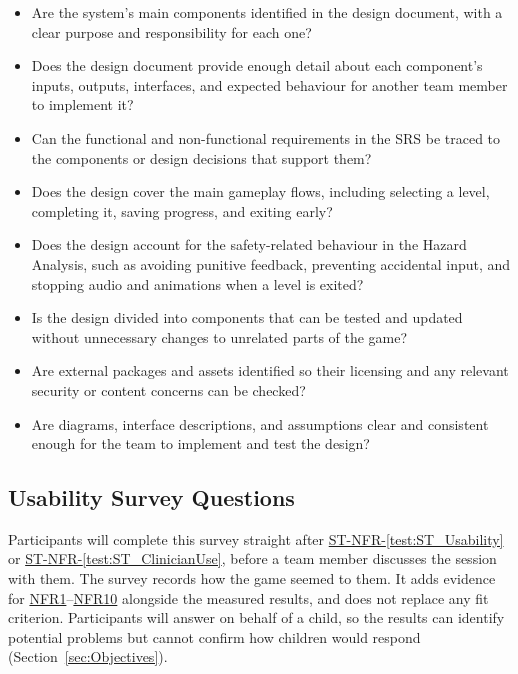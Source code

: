 \documentclass[10pt,titlepage]{article}
\newcommand{\testref}[1]{\hyperref[test:#1]{ST-NFR-\ref*{test:#1}}}
\newcommand{\srsurl}{https://team-hindsight.github.io/ophthamology-game/SRS/SRS.pdf}
\newcommand{\srsnfrref}[2]{\href{\srsurl\#nameddest=#1}{NFR#2}}
\begin{document}
\begin{itemize}[label={$\square$}, leftmargin=*, itemsep=0.35em]
    \item Are the system's main components identified in the design document, with a clear
    purpose and responsibility for each one?

    \item Does the design document provide enough detail about each component's inputs,
    outputs, interfaces, and expected behaviour for another team member to
    implement it?

    \item Can the functional and non-functional requirements in the SRS be
    traced to the components or design decisions that support them?

    \item Does the design cover the main gameplay flows, including selecting
    a level, completing it, saving progress, and exiting early?

    \item Does the design account for the safety-related behaviour in the
    Hazard Analysis, such as avoiding punitive feedback, preventing accidental
    input, and stopping audio and animations when a level is exited?

    \item Is the design divided into components that can be tested and updated
    without unnecessary changes to unrelated parts of the game?

    \item Are external packages and assets identified so their licensing and
    any relevant security or content concerns can be checked?

    \item Are diagrams, interface descriptions, and assumptions clear and
    consistent enough for the team to implement and test the design?
\end{itemize}

\subsection{Usability Survey Questions}\label{sec:UsabilitySurvey}

Participants will complete this survey straight after \testref{ST_Usability} or
\testref{ST_ClinicianUse}, before a team member discusses the session with them.
The survey records how the game seemed to them. It adds evidence for
\srsnfrref{NFR_Layout}{1}--\srsnfrref{NFR_Colour}{10} alongside the measured
results, and does not replace any fit criterion. Participants will answer on
behalf of a child, so the results can identify potential problems but cannot
confirm how children would respond (Section~\ref{sec:Objectives}).
\end{document}
